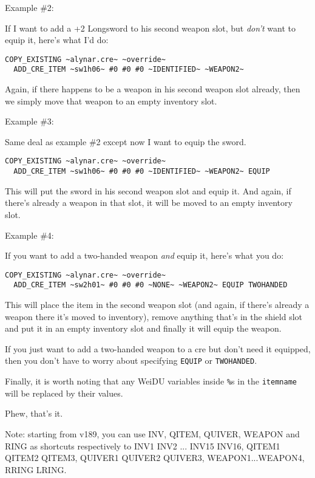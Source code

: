 \documentclass{article}
\def\t#1{{\tt #1}}
\begin{document}
Example \#2:

If I want to add a +2 Longsword to his second weapon slot, but \emph{don't}
want to equip it, here's what I'd do:

\begin{verbatim}
COPY_EXISTING ~alynar.cre~ ~override~
  ADD_CRE_ITEM ~sw1h06~ #0 #0 #0 ~IDENTIFIED~ ~WEAPON2~
\end{verbatim}

Again, if there happens to be a weapon in his second weapon slot already,
then we simply move that weapon to an empty inventory slot.

Example \#3:

Same deal as example \#2 except now I want to equip the sword.

\begin{verbatim}
COPY_EXISTING ~alynar.cre~ ~override~
  ADD_CRE_ITEM ~sw1h06~ #0 #0 #0 ~IDENTIFIED~ ~WEAPON2~ EQUIP
\end{verbatim}

This will put the sword in his second weapon slot and equip it.  And again,
if there's already a weapon in that slot, it will be moved to an empty
inventory slot.

Example \#4:

If you want to add a two-handed weapon \emph{and} equip it, here's what you do:

\begin{verbatim}
COPY_EXISTING ~alynar.cre~ ~override~
  ADD_CRE_ITEM ~sw2h01~ #0 #0 #0 ~NONE~ ~WEAPON2~ EQUIP TWOHANDED
\end{verbatim}

This will place the item in the second weapon slot (and again, if there's
already a weapon there it's moved to inventory), remove anything that's in
the shield slot and put it in an empty inventory slot and finally it will
equip the weapon.

If you just want to add a two-handed weapon to a cre but don't need it
equipped, then you don't have to worry about specifying \t{EQUIP} or
\t{TWOHANDED}.

Finally, it is worth noting that any WeiDU variables inside \t{\%}s in the
\t{itemname} will be replaced by their values.

Phew, that's it.

Note: starting from v189, you can use INV, QITEM, QUIVER, WEAPON and RING as
shortcuts respectively
to INV1 INV2 ... INV15 INV16, QITEM1 QITEM2 QITEM3, QUIVER1 QUIVER2 QUIVER3,
WEAPON1...WEAPON4, RRING LRING.
\end{document}

